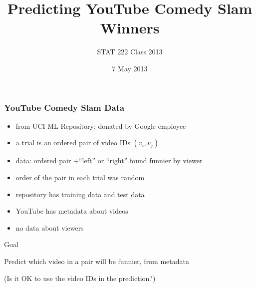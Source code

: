 \documentclass[fleqn]{beamer}
\begin{document}
\title[] %
{Predicting YouTube Comedy Slam Winners}

\author{STAT 222 Class 2013}


\date{7 May 2013 }
\subject{Statistical Machine Learning}


\begin{frame}

\titlepage


\end{frame}


\begin{frame}
\frametitle{YouTube Comedy Slam Data}

	\begin{itemize}
	   \item from UCI ML Repository; donated by Google employee
	   \item a trial is an ordered pair of video IDs $(v_i, v_j)$
	   \item data: ordered pair $+$``left'' or ``right'' found funnier by viewer
	   \item order of the pair in each trial was random
	   \item repository has training data and test data
	   \item YouTube has metadata about videos
	   \item no data about viewers
	\end{itemize}

	\begin{beamerboxesrounded}{Goal}
	\begin{center}
	    Predict which video in a pair will be funnier, from metadata
         \end{center}
         \begin{center}
         \small{(Is it OK to use the video IDs in the prediction?)}
         \end{center}
	\end{beamerboxesrounded}
\end{frame}
\end{document}
